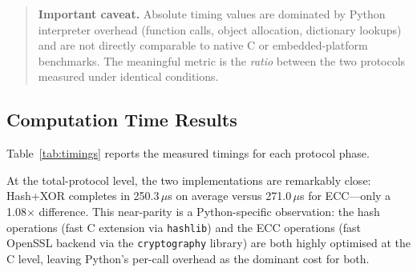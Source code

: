 \documentclass[journal]{IEEEtran}
\begin{document}
\begin{quote}
\textbf{Important caveat.} Absolute timing values are dominated by Python
interpreter overhead (function calls, object allocation, dictionary lookups)
and are not directly comparable to native C or embedded-platform benchmarks.
The meaningful metric is the \emph{ratio} between the two protocols measured
under identical conditions.
\end{quote}

\subsection{Computation Time Results}

Table~\ref{tab:timings} reports the measured timings for each protocol phase.

\begin{table}[!t]
\caption{Computation Time ($\mu$s, 100 iterations, 10 warmup)}
\label{tab:timings}
\centering
\small
{}
\end{table}

At the total-protocol level, the two implementations are remarkably close:
Hash+XOR completes in 250.3\,$\mu$s on average versus 271.0\,$\mu$s for
ECC---only a 1.08$\times$ difference. This near-parity is a Python-specific
observation: the hash operations (fast C extension via \texttt{hashlib}) and
the ECC operations (fast OpenSSL backend via the \texttt{cryptography} library)
are both highly optimised at the C level, leaving Python's per-call overhead
as the dominant cost for both.
\end{document}
